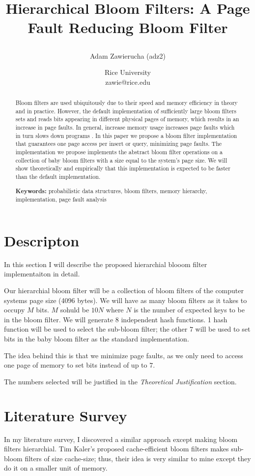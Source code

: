 \documentclass[a4paper]{article}
\title{Hierarchical Bloom Filters: A Page Fault Reducing Bloom Filter
\author{Adam Zawierucha (adz2)}

\date{
	Rice University \\ zawie@rice.edu}%
}
\theoremstyle{plain}
\theoremstyle{definition}
\begin{document}
	\maketitle
	
	\begin{abstract}
		Bloom filters \cite{Bloom} are used ubiquitously due to their speed and memory efficiency in theory and in practice.
        However, the default implementation of sufficiently large bloom filters sets and reads bits appearing in different physical pages of memory,
        which results in an increase in page faults. In general, increase memory usage increases page faults which in turn slows down programs \cite{TAY200699}. 
        In this paper we propose a bloom filter implementation that guarantees one page access per insert or query, minimizing page faults.
        The implementation we propose implements the abstract bloom filter operations on a collection of baby bloom filters with a size equal to the system's page size.
        We will show theoretically and empirically that this implementation is expected to be faster than the default implementation.

		\noindent\textbf{Keywords:} probabilistic data structures, bloom filters, memory hierarchy, implementation, page fault analysis
	\end{abstract}
	

	\section{Descripton}
	In this section I will describe the proposed hierarchial blooom filter implementaiton in detail.

	Our hierarchial bloom filter will be a collection of bloom filters of the computer systems page size (4096 bytes).
	We will have as many bloom filters as it takes to occupy $M$ bits. $M$ sohuld be $10N$ where $N$ is the number of expected keys to be in the bloom filter.
	We will generate $8$ independent hash functions. 1 hash function will be used to select the sub-bloom filter; the other $7$ will be used to set bits in the baby bloom filter as the standard implementation.

	The idea behind this is that we minimize page faults, as we only need to access one page of memory to set bits instead of up to $7$.

	The numbers selected will be justified in the \textit{Theoretical Justification} section.
	
	\section{Literature Survey}
	In my literature survey, I discovered a similar approach except making bloom filters hierarchial.
	Tim Kaler's proposed cache-efficient bloom filters \cite{Kaler} makes sub-bloom filters of size cache-size; thus, their idea is very similar to mine except they do it on a smaller unit of memory.
\end{document}
